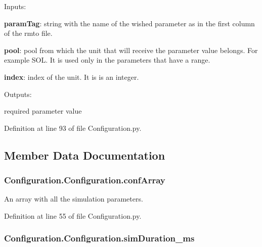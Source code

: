 \begin{DoxyItemize}
\item Inputs\-:
\begin{DoxyItemize}
\item {\bfseries param\-Tag}\-: string with the name of the wished parameter as in the first column of the rmto file.
\item {\bfseries pool}\-: pool from which the unit that will receive the parameter value belongs. For example S\-O\-L. It is used only in the parameters that have a range.
\item {\bfseries index}\-: index of the unit. It is is an integer.
\end{DoxyItemize}
\item Outputs\-:
\begin{DoxyItemize}
\item required parameter value 
\end{DoxyItemize}
\end{DoxyItemize}

Definition at line 93 of file Configuration.\-py.



\subsection{Member Data Documentation}
\hypertarget{class_configuration_1_1_configuration_a2b8c2d210ef82ba5088de3c8c9a8725d}{
\subsubsection[{conf\-Array}]{\setlength{\rightskip}{0pt plus 5cm}Configuration.\-Configuration.\-conf\-Array}}\label{class_configuration_1_1_configuration_a2b8c2d210ef82ba5088de3c8c9a8725d}


An array with all the simulation parameters. 



Definition at line 55 of file Configuration.\-py.

\hypertarget{class_configuration_1_1_configuration_aea238884fe3daa1287aa069f35d4ad3e}{
\subsubsection[{sim\-Duration\-\_\-ms}]{\setlength{\rightskip}{0pt plus 5cm}Configuration.\-Configuration.\-sim\-Duration\-\_\-ms}}\label{class_configuration_1_1_configuration_aea238884fe3daa1287aa069f35d4ad3e}


